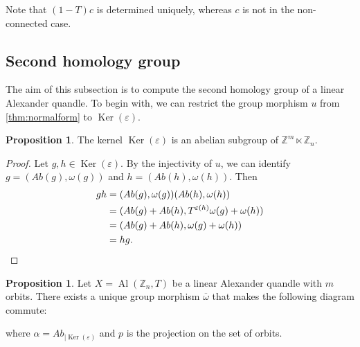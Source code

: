\documentclass[a4paper,11pt]{amsart}
\theoremstyle{definition}
\newtheorem{prop}[thm]{Proposition}
\newcommand{\Z}{{\mathbb Z}}
\DeclareMathOperator{\Ker}{Ker}
\DeclareMathOperator{\Al}{Al}
\newcommand{\znz}[1]{\Z_{#1}}
\begin{document}
Note that $(1-T)c$ is determined uniquely, whereas $c$ is not in the non-connected case.

\subsection{Second homology group}
The aim of this subsection is to compute the second homology group of a linear Alexander quandle.
To begin with, we can restrict the group morphism $u$ from \cref{thm:normalform} to $\Ker(\varepsilon)$.
\begin{prop}
The kernel $\Ker(\varepsilon)$ is an abelian subgroup of $\Z^m\ltimes \znz{n}$.
\end{prop}

\begin{proof}
Let $g,h\in \Ker(\varepsilon)$.
By the injectivity of $u$, we can identify $g=(Ab(g), \omega(g))$ and $h=(Ab(h), \omega(h))$.
Then
\begin{align*}
gh & = (Ab(g), \omega(g))(Ab(h), \omega(h))\\
& = (Ab(g) + Ab(h), T^{\varepsilon(h)} \omega(g) + \omega(h))\\
& = (Ab(g) + Ab(h), \omega(g) + \omega(h))\\
& = hg.\qedhere
\end{align*}
\end{proof}

\begin{prop}
Let $X = \Al(\znz{n},T)$ be a linear Alexander quandle with $m$ orbits.
There exists a unique group morphism $\overline{\omega}$ that makes the following diagram commute:

\begin{center}
\end{center}
where $\alpha= Ab_{\vert \Ker(\varepsilon)}$ and $p$ is the projection on the set of orbits.
\end{prop}
\end{document}
